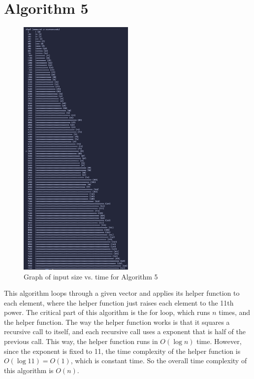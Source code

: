 \documentclass{article}
\begin{document}
\section*{Algorithm 5}
\begin{figure}[H]
    \centering
    \includegraphics[width=0.5\textwidth]{./images/algo5.png}
    \caption{Graph of input size vs. time for Algorithm 5}
\end{figure}

This algorithm loops through a given vector and applies its helper function to each element, where the helper function just raises each element to the 11th power.
The critical part of this algorithm is the for loop, which runs $n$ times, and the helper function.
The way the helper function works is that it squares a recursive call to itself, and each recursive call uses a exponent that is half of the previous call.
This way, the helper function runs in $O(\log n)$ time.
However, since the exponent is fixed to 11, the time complexity of the helper function is $O(\log 11) = O(1)$, which is constant time.
So the overall time complexity of this algorithm is $O(n)$.
\end{document}
